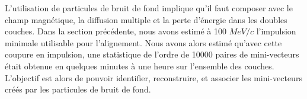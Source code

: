    
   \medskip
   
   L'utilisation de particules de bruit de fond implique qu'il faut composer avec le champ magn\'etique, la diffusion multiple et la perte d'\'energie dans les doubles couches. Dans la section pr\'ec\'edente, nous avons estim\'e \`a 100 $MeV/c$ l'impulsion minimale utilisable pour l'alignement. Nous avons alors estim\'e qu'avec cette coupure en impulsion, une statistique de l'ordre de 10000 paires de mini-vecteurs \'etait obtenue en quelques minutes \`a une heure sur l'ensemble des couches. L'objectif est alors de pouvoir identifier, reconstruire, et associer les mini-vecteurs cr\'e\'es par les particules de bruit de fond.
   
